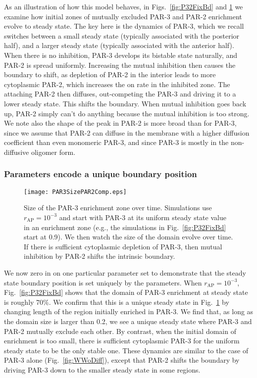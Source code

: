 \documentclass[11pt]{article}
\newcommand{\6}[1]{#1_{\text{6}}}
\newcommand{\3}[1]{#1_{\text{3}}}
\begin{document}
As an illustration of how this model behaves, in Figs.\ \ref{fig:P32FixBd} and \ref{fig:P32FixBdEq} we examine how initial zones of mutually excluded PAR-3 and PAR-2 enrichment evolve to steady state. The key here is the dynamics of PAR-3, which we recall switches between a small steady state (typically associated with the posterior half), and a larger steady state (typically associated with the anterior half). When there is no inhibition, PAR-3 develops its bistable state naturally, and PAR-2 is spread uniformly. Increasing the mutual inhibition then causes the boundary to shift, as depletion of PAR-2 in the interior leads to more cytoplasmic PAR-2, which increases the on rate in the inhibited zone. The attaching PAR-2 then diffuses, out-competing the PAR-3 and driving it to a lower steady state. This shifts the boundary. When mutual inhibition goes back up, PAR-2 simply can't do anything because the mutual inhibition is too strong. We note also the shape of the peak in PAR-2 is more broad than for PAR-3, since we assume that PAR-2 can diffuse in the membrane with a higher diffusion coefficient than even monomeric PAR-3, and since PAR-3 is mostly in the non-diffusive oligomer form. 

\subsubsection{Parameters encode a unique boundary position}

\begin{figure}
\centering
\texttt{[image: PAR3SizePAR2Comp.eps]}
\caption{\label{fig:P32FixBdEq}Size of the PAR-3 enrichment zone over time. Simulations use $r_\text{AP}=10^{-3}$ and start with PAR-3 at its uniform steady state value in an enrichment zone (e.g., the simulations in Fig.\ \ref{fig:P32FixBd} start at 0.9). We then watch the size of the domain evolve over time. If there is sufficient cytoplasmic depletion of PAR-3, then mutual inhibition by PAR-2 shifts the intrinsic boundary.}
\end{figure}

We now zero in on one particular parameter set to demonstrate that the steady state boundary position is set uniquely by the parameters. When $r_\text{AP}=10^{-3}$, Fig.\ \ref{fig:P32FixBd} shows that the domain of PAR-3 enrichment at steady state is roughly 70\%. We confirm that this is a unique steady state in Fig.\ \ref{fig:P32FixBdEq} by changing length of the region initially enriched in PAR-3. We find that, as long as the domain size is larger than 0.2, we see a unique steady state where PAR-3 and PAR-2 mutually exclude each other. By contrast, when the initial domain of enrichment is too small, there is sufficient cytoplasmic PAR-3 for the uniform steady state to be the only stable one. These dynamics are similar to the case of PAR-3 alone (Fig.\ \ref{fig:WWoDiff}), except that PAR-2 shifts the boundary by driving PAR-3 down to the smaller steady state in some regions.
\end{document}
